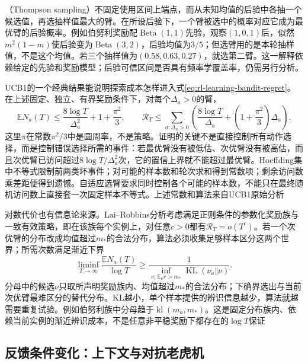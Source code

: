 （Thompson sampling）不固定使用区间上端点，而从未知均值的后验中各抽一个候选值，再选抽样值最大的臂。在所设后验下，一个臂被选中的概率对应它成为最优臂的后验概率。例如伯努利奖励配$\operatorname{Beta}(1,1)$先验，观察$(1,0,1)$后，似然$m^2(1-m)$使后验变为$\operatorname{Beta}(3,2)$，后验均值为$3/5$；但选臂用的是本轮抽样值，不是这个均值。若三个抽样值为$(0.58,0.63,0.27)$，就选第二臂。这一解释依赖给定的先验和奖励模型；后验可信区间是否具有频率学覆盖率，仍需另行分析。

UCB1的一个经典结果能说明探索成本怎样进入式\eqref{eq:rl-learning-bandit-regret}。在上述固定、独立、有界奖励条件下，对每个$\Delta_a>0$的臂，
\begin{equation}
  \mathbb E N_a(T)
  \leq \frac{8\log T}{\Delta_a^2}+1+\frac{\pi^2}{3},
  \qquad
  \mathcal R_T
  \leq\sum_{a:\Delta_a>0}
    \left(\frac{8\log T}{\Delta_a}
    +\left(1+\frac{\pi^2}{3}\right)\Delta_a\right).
  \label{eq:rl-learning-ucb-bound}
\end{equation}
这里$\pi$在常数$\pi^2/3$中是圆周率，不是策略。证明的关键不是直接控制所有动作选择，而是控制错误选择所需的事件：若最优臂没有被低估、次优臂没有被高估，而且次优臂已访问超过$8\log T/\Delta_a^2$次，它的置信上界就不能超过最优臂。Hoeffding集中不等式限制前两类坏事件；对可能的样本数和轮次求和得到常数项；剩余访问数乘差距便得到遗憾。自适应选臂要求同时控制各个可能的样本数，不能只在最终随机访问数上直接套一次固定样本不等式。上述常数和算法来自UCB1原始分析

对数代价也有信息论来源。Lai--Robbins分析考虑满足正则条件的参数化奖励族与一致有效策略，即在该族每个实例上，对任意$c>0$都有$\mathcal R_T=o(T^c)$。若一个次优臂的分布改成均值超过$m_*$的合法分布，算法必须收集足够样本区分这两个世界；所需次数满足渐近下界
\[
  \liminf_{T\to\infty}\frac{\mathbb E N_a(T)}{\log T}
  \geq
  \frac{1}{\inf_{\nu:\,\mathbb E_\nu r>m_*}
                \operatorname{KL}(\nu_a\Vert\nu)}.
\]
分母中的候选$\nu$只取所声明奖励族内、均值超过$m_*$的合法分布；下确界选出与当前次优臂最难区分的替代分布。KL越小，单个样本提供的辨识信息越少，算法就越需要重复试验。例如伯努利族中分母趋于$\operatorname{kl}(m_a,m_*)$。这是固定分布族内、依赖当前实例的渐近辨识成本，不是任意非平稳奖励下都存在的$\log T$保证

\subsection{反馈条件变化：上下文与对抗老虎机}
\label{sec:rl-learning-contextual}


